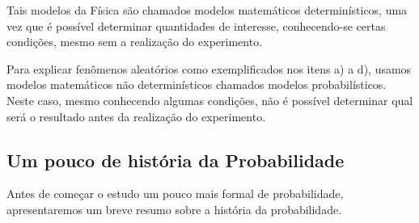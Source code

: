 Tais modelos da Física são chamados modelos matemáticos determinísticos, uma vez que é possível determinar quantidades de interesse, conhecendo-se certas condições, mesmo sem a realização do experimento.

Para explicar fenômenos aleatórios como exemplificados nos itens a) a d), usamos modelos matemáticos não determinísticos chamados modelos probabilísticos. Neste caso, mesmo conhecendo algumas condições, não é possível determinar qual será o resultado antes da realização do experimento.


\subsection{Um pouco de história da Probabilidade}
\label{\detokenize{PE511-0:um-pouco-de-historia-da-probabilidade}}
Antes de começar o estudo um pouco mais formal de probabilidade, apresentaremos um breve resumo sobre a história da probabilidade.
